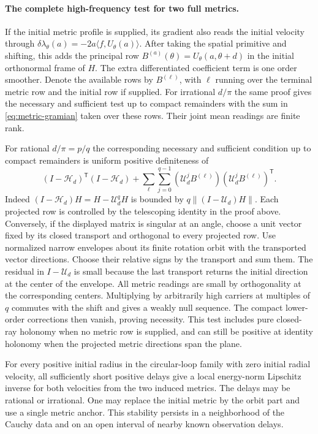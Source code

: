 \paragraph{The complete high-frequency test for two full metrics.}
If the initial metric profile is supplied, its gradient
also reads the initial velocity through
$\delta\lambda_\theta(a)=-2a\langle f,U_\theta(a)\rangle$.
After taking the spatial primitive and shifting,
this adds the principal row
$B^{(a)}(\theta)=U_\theta(a,\theta+d)$ in the initial
orthonormal frame of $H$.
The extra differentiated coefficient term is
one order smoother. Denote the available rows by
$B^{(\ell)}$, with $\ell$ running over the terminal
metric row and the initial row if supplied.
For irrational $d/\pi$ the same proof gives the
necessary and sufficient test up to compact
remainders with the sum in
\eqref{eq:metric-gramian} taken over these rows.
Their joint mean readings are finite rank.

For rational $d/\pi=p/q$ the corresponding necessary
and sufficient condition up to compact remainders is
uniform positive definiteness of
\begin{equation}
 (I-\mathcal H_d)^\mathsf{T}(I-\mathcal H_d)
 +\sum_{\ell}\sum_{j=0}^{q-1}
   (\mathcal U_d^jB^{(\ell)})
   (\mathcal U_d^jB^{(\ell)})^\mathsf{T}.
 \label{eq:rational-full-metric}
\end{equation}
Indeed $(I-\mathcal H_d)H=H-\mathcal U_d^qH$
is bounded by $q\|(I-\mathcal U_d)H\|$.
Each projected row is controlled by the telescoping
identity in the proof above. Conversely, if the
displayed matrix is singular at an angle, choose
a unit vector fixed by its closed transport and
orthogonal to every projected row.
Use normalized narrow envelopes about its finite
rotation orbit with the transported vector
directions. Choose their relative signs by the
transport and sum them. The residual in
$I-\mathcal U_d$ is small because the last
transport returns the initial direction at the
center of the envelope. All metric readings are
small by orthogonality at the corresponding centers.
Multiplying by arbitrarily high carriers at
multiples of $q$ commutes with the shift and
gives a weakly null sequence. The compact
lower-order corrections then vanish, proving
necessity. This test includes pure closed-ray
holonomy when no metric row is supplied, and
can still be positive at identity holonomy when
the projected metric directions span the plane.

\begin{proposition}
\label{prop:irrational-metric}
For every positive initial radius in the circular-loop
family with zero initial radial velocity, all sufficiently
short positive delays give a local energy-norm
Lipschitz inverse for both velocities from the two
induced metrics. The delays may be rational or irrational.
One may replace the initial metric by the orbit
part and use a single metric anchor. This stability
persists in a neighborhood of the Cauchy data
and on an open interval of nearby known observation
delays.
\end{proposition}

